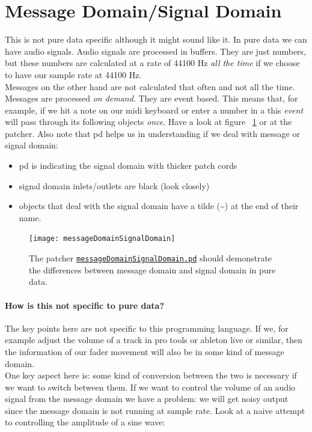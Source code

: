 \section{Message Domain/Signal Domain}
This is not pure data specific although it might sound like it.
In pure data we can have audio signals. Audio signals are processed in buffers. They are just numbers, but these numbers are calculated at a rate of 44100 Hz \textit{all the time} if we choose to have our sample rate at 44100 Hz.\\
Messages on the other hand are not calculated that often and not all the time. Messages are processed \textit{on demand}. They are event based. This means that, for example, if we hit a note on our midi keyboard or enter a number in a  this \textit{event} will pass through its following objects \textit{once}. Have a look at figure ~\ref{fig:mesSig} or at the patcher. Also note that pd helps us in understanding if we deal with message or signal domain:

\begin{itemize}
	\item pd is indicating the signal domain with thicker patch cords
	\item signal domain inlets/outlets are black (look closely)
	\item objects that deal with the signal domain have a tilde (\textasciitilde ) at the end of their name.
\end{itemize}

\begin{figure}[h!]
	\centering
	\texttt{[image: messageDomainSignalDomain]}
	\caption[message domain vs. signal domain]
	{The patcher \href{./patchers/00\_introduction/messageDomainSignalDomain.pd}{\texttt{messageDomainSignalDomain.pd}} should demonstrate the differences between message domain and signal domain in pure data.}
	\label{fig:mesSig}
\end{figure}

\paragraph{How is this not specific to pure data?} The key points here are not specific to this programming language. If we, for example adjust the volume of a track in pro tools or ableton live or similar, then the information of our fader movement will also be in some kind of message domain.\\
One key aspect here is: some kind of conversion between the two is necessary if we want to switch between them. If we want to control the volume of an audio signal from the message domain we have a problem: we will get noisy output since the message domain is not running at sample rate. Look at a naive attempt to controlling the amplitude of a sine wave:

